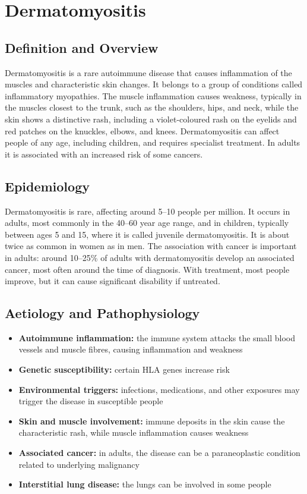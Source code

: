 \chapter{Dermatomyositis}

\section*{Definition and Overview}
Dermatomyositis is a rare autoimmune disease that causes inflammation of the muscles and characteristic skin changes. It belongs to a group of conditions called inflammatory myopathies. The muscle inflammation causes weakness, typically in the muscles closest to the trunk, such as the shoulders, hips, and neck, while the skin shows a distinctive rash, including a violet-coloured rash on the eyelids and red patches on the knuckles, elbows, and knees. Dermatomyositis can affect people of any age, including children, and requires specialist treatment. In adults it is associated with an increased risk of some cancers.

\section*{Epidemiology}
Dermatomyositis is rare, affecting around 5--10 people per million. It occurs in adults, most commonly in the 40--60 year age range, and in children, typically between ages 5 and 15, where it is called juvenile dermatomyositis. It is about twice as common in women as in men. The association with cancer is important in adults: around 10--25\% of adults with dermatomyositis develop an associated cancer, most often around the time of diagnosis. With treatment, most people improve, but it can cause significant disability if untreated.

\section*{Aetiology and Pathophysiology}
\begin{itemize}
    \item \textbf{Autoimmune inflammation:} the immune system attacks the small blood vessels and muscle fibres, causing inflammation and weakness
    \item \textbf{Genetic susceptibility:} certain HLA genes increase risk
    \item \textbf{Environmental triggers:} infections, medications, and other exposures may trigger the disease in susceptible people
    \item \textbf{Skin and muscle involvement:} immune deposits in the skin cause the characteristic rash, while muscle inflammation causes weakness
    \item \textbf{Associated cancer:} in adults, the disease can be a paraneoplastic condition related to underlying malignancy
    \item \textbf{Interstitial lung disease:} the lungs can be involved in some people
\end{itemize}

